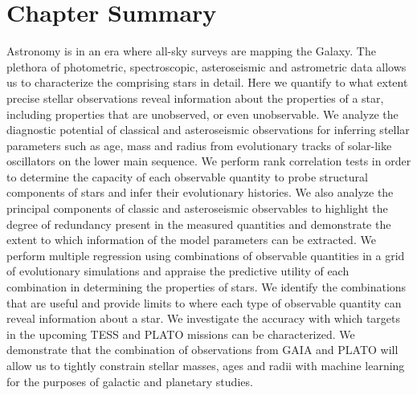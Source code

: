 \section*{Chapter Summary}
Astronomy is in an era where all-sky surveys are mapping the Galaxy. 
The plethora of photometric, spectroscopic, asteroseismic and astrometric data allows us to characterize the comprising stars in detail.  
Here we quantify to what extent precise stellar observations reveal information about the properties of a star, including properties that are unobserved, or even unobservable. 
We analyze the diagnostic potential of classical and asteroseismic observations for inferring stellar parameters such as age, mass and radius from evolutionary tracks of solar-like oscillators on the lower main sequence. 
We perform rank correlation tests in order to determine the capacity of each observable quantity to probe structural components of stars and infer their evolutionary histories. We also analyze the principal components of classic and asteroseismic observables to highlight the degree of redundancy present in the measured quantities and demonstrate the extent to which information of the model parameters can be extracted.
We perform multiple regression using combinations of observable quantities in a grid of evolutionary simulations and appraise the predictive utility of each combination in determining the properties of stars.
We identify the combinations that are useful and provide limits to where each type of observable quantity can reveal information about a star. We investigate the accuracy with which targets in the upcoming TESS and PLATO missions can be characterized.  We demonstrate that the combination of observations from GAIA and PLATO will allow us to tightly constrain stellar masses, ages and radii with machine learning for the purposes of galactic and planetary studies.



